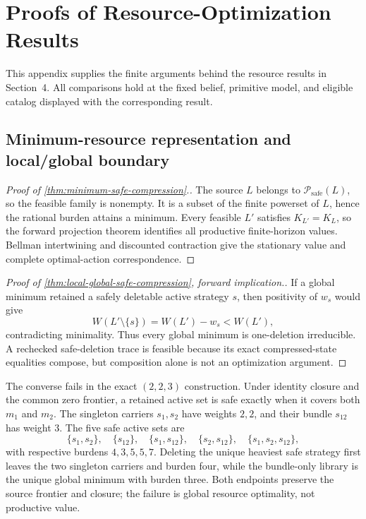 \section{Proofs of Resource-Optimization Results}
\label{app:optimization-proofs}

This appendix supplies the finite arguments behind the resource results in
Section~4.  All comparisons hold at the fixed belief, primitive model, and
eligible catalog displayed with the corresponding result.

\subsection{Minimum-resource representation and local/global boundary}
\label{app:safe-optimization-proof}

\begin{proof}[Proof of \cref{thm:minimum-safe-compression}.]
The source \(L\) belongs to \(\mathcal P_{\mathrm{safe}}(L)\), so the feasible
family is nonempty.  It is a subset of the finite powerset of \(L\), hence the
rational burden attains a minimum.  Every feasible \(L'\) satisfies
\(K_{L'}=K_L\), so the forward projection theorem identifies all productive
finite-horizon values.  Bellman intertwining and discounted contraction give
the stationary value and complete optimal-action correspondence.
\end{proof}

\begin{proof}[Proof of \cref{thm:local-global-safe-compression}, forward
implication.]
If a global minimum retained a safely deletable active strategy \(s\), then
positivity of \(w_s\) would give
\[
 W(L'\setminus\{s\})=W(L')-w_s<W(L'),
\]
contradicting minimality.  Thus every global minimum is one-deletion
irreducible.  A rechecked safe-deletion trace is feasible because its exact
compressed-state equalities compose, but composition alone is not an
optimization argument.
\end{proof}

The converse fails in the exact \((2,2,3)\) construction.  Under identity
closure and the common zero frontier, a retained active set is safe exactly
when it covers both \(m_1\) and \(m_2\).  The singleton carriers \(s_1,s_2\)
have weights \(2,2\), and their bundle \(s_{12}\) has weight \(3\).  The five
safe active sets are
\[
 \{s_1,s_2\},\quad \{s_{12}\},\quad
 \{s_1,s_{12}\},\quad \{s_2,s_{12}\},\quad
 \{s_1,s_2,s_{12}\},
\]
with respective burdens \(4,3,5,5,7\).  Deleting the unique heaviest safe
strategy first leaves the two singleton carriers and burden four, while the
bundle-only library is the unique global minimum with burden three.  Both
endpoints preserve the source frontier and closure; the failure is global
resource optimality, not productive value.

